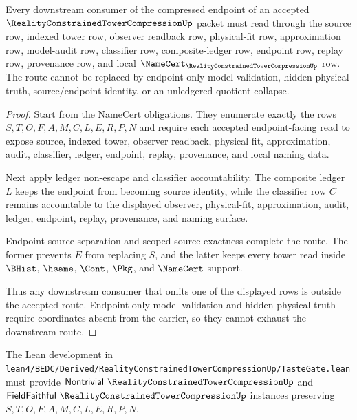 \begin{theorem}
\label{thm:reality-constrained-tower-compression-downstream-route-exhaustion}
Every downstream consumer of the compressed endpoint of an accepted $\RealityConstrainedTowerCompressionUp$ packet must read through the source row, indexed tower row, observer readback row, physical-fit row, approximation row, model-audit row, classifier row, composite-ledger row, endpoint row, replay row, provenance row, and local $\NameCert_{\RealityConstrainedTowerCompressionUp}$ row. The route cannot be replaced by endpoint-only model validation, hidden physical truth, source/endpoint identity, or an unledgered quotient collapse.
\end{theorem}
\begin{proof}
Start from the NameCert obligations. They enumerate exactly the rows $S,T,O,F,A,M,C,L,E,R,P,N$ and require each accepted endpoint-facing read to expose source, indexed tower, observer readback, physical fit, approximation, audit, classifier, ledger, endpoint, replay, provenance, and local naming data.

Next apply ledger non-escape and classifier accountability. The composite ledger $L$ keeps the endpoint from becoming source identity, while the classifier row $C$ remains accountable to the displayed observer, physical-fit, approximation, audit, ledger, endpoint, replay, provenance, and naming surface.

Endpoint-source separation and scoped source exactness complete the route. The former prevents $E$ from replacing $S$, and the latter keeps every tower read inside $\BHist$, $\hsame$, $\Cont$, $\Pkg$, and $\NameCert$ support.

Thus any downstream consumer that omits one of the displayed rows is outside the accepted route. Endpoint-only model validation and hidden physical truth require coordinates absent from the carrier, so they cannot exhaust the downstream route.
\end{proof}

The Lean development in \texttt{lean4/BEDC/Derived/RealityConstrainedTowerCompressionUp/TasteGate.lean} must provide $\mathsf{Nontrivial}\ \RealityConstrainedTowerCompressionUp$ and $\mathsf{FieldFaithful}\ \RealityConstrainedTowerCompressionUp$ instances preserving $S,T,O,F,A,M,C,L,E,R,P,N$.

